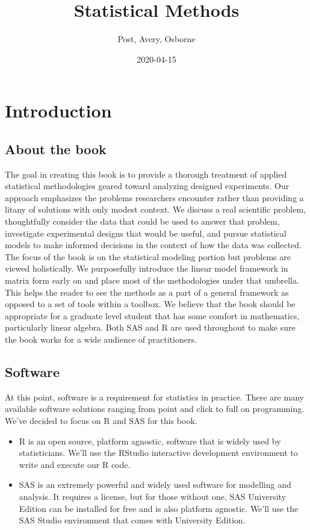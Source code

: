 \documentclass[
]{book}
\title{Statistical Methods}
\author{Post, Avery, Osborne}
\date{2020-04-15}
\theoremstyle{definition}
\theoremstyle{definition}
\theoremstyle{definition}
\theoremstyle{remark}
\begin{document}
\maketitle

{
\setcounter{tocdepth}{1}
\tableofcontents
}
\hypertarget{introduction}{%
\chapter{Introduction}\label{introduction}}

\hypertarget{about-the-book}{%
\section{About the book}\label{about-the-book}}

The goal in creating this book is to provide a thorough treatment of applied statistical methodologies geared toward analyzing designed experiments. Our approach emphasizes the problems researchers encounter rather than providing a litany of solutions with only modest context. We discuss a real scientific problem, thoughtfully consider the data that could be used to answer that problem, investigate experimental designs that would be useful, and pursue statistical models to make informed decisions in the context of how the data was collected. The focus of the book is on the statistical modeling portion but problems are viewed holistically. We purposefully introduce the linear model framework in matrix form early on and place most of the methodologies under that umbrella. This helps the reader to see the methods as a part of a general framework as opposed to a set of tools within a toolbox. We believe that the book should be appropriate for a graduate level student that has some comfort in mathematics, particularly linear algebra. Both SAS and R are used throughout to make sure the book works for a wide audience of practitioners.

\hypertarget{software}{%
\section{Software}\label{software}}

At this point, software is a requirement for statistics in practice. There are many available software solutions ranging from point and click to full on programming. We've decided to focus on R and SAS for this book.

\begin{itemize}
\item
  R is an open source, platform agnostic, software that is widely used by statisticians. We'll use the RStudio interactive development environment to write and execute our R code.
\item
  SAS is an extremely powerful and widely used software for modelling and analysis. It requires a license, but for those without one, SAS University Edition can be installed for free and is also platform agnostic. We'll use the SAS Studio environment that comes with University Edition.
\end{itemize}
\end{document}
